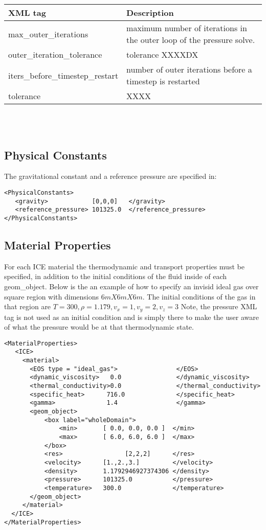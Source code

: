 \noindent
\footnotesize
\begin{tabular}{l p{8cm}}
XML tag &  Description\\
\hline
\hline
max\_outer\_iterations           &  maximum number of iterations in the outer loop of the pressure solve.\\
outer\_iteration\_tolerance      &  tolerance XXXXDX\\
iters\_before\_timestep\_restart &  \footnotesize number of outer iterations before a timestep is restarted\\
tolerance                        &   XXXX\\
\hline
\end{tabular}
\normalsize\\
\\
\subsection{Physical Constants}
The gravitational constant and a reference pressure are specified in:
\begin{Verbatim}[fontsize=\footnotesize]
<PhysicalConstants>
   <gravity>            [0,0,0]   </gravity>
   <reference_pressure> 101325.0  </reference_pressure>
</PhysicalConstants>
\end{Verbatim}
%
\subsection{Material Properties}
For each ICE material the thermodynamic and transport properties must be
specified, in addition to the initial conditions of the fluid inside of
each geom\_object.  Below is the an example of how to specify an invisid
ideal gas over square region with dimensions $6m X 6m X 6m$.  The initial
conditions of the gas in that region are $T=300, \rho=1.179, v_x=1,v_y=2,
v_z=3$ \big{(}Note, the pressure XML tag is not used as an initial condition
and is simply there to make the user aware of what the pressure would be at
that thermodynamic state.\big{)}
%
\begin{Verbatim}[fontsize=\footnotesize]
<MaterialProperties>
   <ICE>
     <material>
       <EOS type = "ideal_gas">                </EOS>
       <dynamic_viscosity>   0.0               </dynamic_viscosity>
       <thermal_conductivity>0.0               </thermal_conductivity>
       <specific_heat>      716.0              </specific_heat>
       <gamma>              1.4                </gamma>
       <geom_object>
           <box label="wholeDomain">
               <min>       [ 0.0, 0.0, 0.0 ]  </min>
               <max>       [ 6.0, 6.0, 6.0 ]  </max>
           </box>
           <res>                 [2,2,2]      </res>
           <velocity>      [1.,2.,3.]         </velocity>
           <density>       1.1792946927374306 </density>
           <pressure>      101325.0           </pressure>     
           <temperature>   300.0              </temperature>
       </geom_object>
     </material>
  </ICE>       
</MaterialProperties>
\end{Verbatim}
